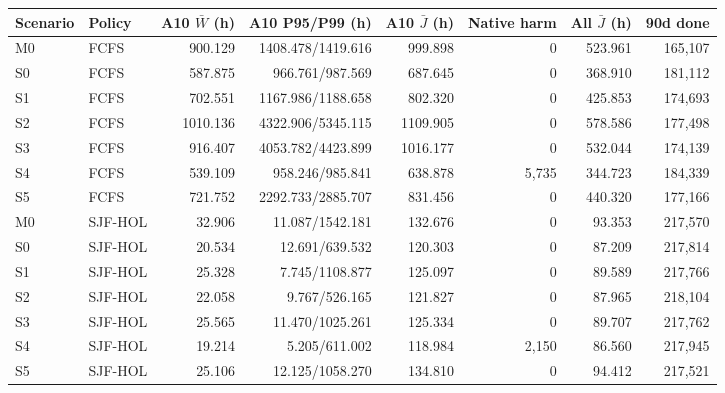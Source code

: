 \begin{tabular}{llrrrrrr}
\toprule
Scenario & Policy & A10 $\bar W$ (h) & A10 P95/P99 (h) & A10 $\bar J$ (h) & Native harm & All $\bar J$ (h) & 90d done \\
\midrule
M0 & FCFS & 900.129 & 1408.478/1419.616 & 999.898 & 0 & 523.961 & 165,107 \\
S0 & FCFS & 587.875 & 966.761/987.569 & 687.645 & 0 & 368.910 & 181,112 \\
S1 & FCFS & 702.551 & 1167.986/1188.658 & 802.320 & 0 & 425.853 & 174,693 \\
S2 & FCFS & 1010.136 & 4322.906/5345.115 & 1109.905 & 0 & 578.586 & 177,498 \\
S3 & FCFS & 916.407 & 4053.782/4423.899 & 1016.177 & 0 & 532.044 & 174,139 \\
S4 & FCFS & 539.109 & 958.246/985.841 & 638.878 & 5,735 & 344.723 & 184,339 \\
S5 & FCFS & 721.752 & 2292.733/2885.707 & 831.456 & 0 & 440.320 & 177,166 \\
M0 & SJF-HOL & 32.906 & 11.087/1542.181 & 132.676 & 0 & 93.353 & 217,570 \\
S0 & SJF-HOL & 20.534 & 12.691/639.532 & 120.303 & 0 & 87.209 & 217,814 \\
S1 & SJF-HOL & 25.328 & 7.745/1108.877 & 125.097 & 0 & 89.589 & 217,766 \\
S2 & SJF-HOL & 22.058 & 9.767/526.165 & 121.827 & 0 & 87.965 & 218,104 \\
S3 & SJF-HOL & 25.565 & 11.470/1025.261 & 125.334 & 0 & 89.707 & 217,762 \\
S4 & SJF-HOL & 19.214 & 5.205/611.002 & 118.984 & 2,150 & 86.560 & 217,945 \\
S5 & SJF-HOL & 25.106 & 12.125/1058.270 & 134.810 & 0 & 94.412 & 217,521 \\
\bottomrule
\end{tabular}
